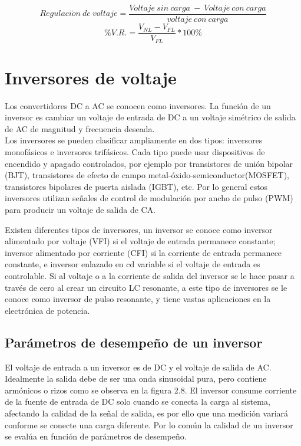 $$Regulaci\acute{o}n\:de\: voltaje = \dfrac{Voltaje\: sin \:carga \:-\: Voltaje\: con\: carga}{voltaje\: con\: carga}$$
\begin{equation} 
 \%V.R. = \dfrac{V_{NL}-V_{FL}}{V_{FL}}*100\%
\end{equation}





\newpage

\section{Inversores de voltaje}

Los convertidores DC a AC se conocen como inversores. La función de un inversor es cambiar un voltaje de entrada de DC a un voltaje simétrico de salida de AC de magnitud y frecuencia deseada. \\

Los inversores se pueden clasificar ampliamente en dos tipos: inversores monofásicos e inversores trifásicos. Cada tipo puede usar dispositivos de encendido y apagado controlados, por ejemplo por transistores de unión bipolar (BJT), transistores de efecto de campo metal-óxido-semiconductor(MOSFET), transistores bipolares de puerta aislada (IGBT), etc. Por lo general estos inversores utilizan señales de control de modulación por ancho de pulso  (PWM) para producir un voltaje de salida de CA.

Existen diferentes tipos de inversores, un inversor se conoce como inversor alimentado por voltaje (VFI) si el voltaje de entrada permanece constante; inversor alimentado por corriente (CFI) si la corriente de entrada permanece constante, e inversor enlazado en cd variable si el voltaje de entrada es controlable. Si al voltaje o a la corriente de salida del inversor se le hace pasar a través de cero al crear un circuito LC resonante, a este tipo de inversores se le conoce como inversor de pulso resonante, y tiene vastas aplicaciones en la electrónica de potencia. \\

\subsection{Parámetros de desempeño de un inversor}

El voltaje de entrada a un inversor es de DC y el voltaje de salida de AC. Idealmente la salida debe de ser una onda sinusoidal pura, pero contiene armónicos o rizos como se observa en la figura 2.8. El inversor consume corriente de la fuente de entrada de DC solo cuando se conecta la carga al sistema, afectando la calidad de la señal de salida, es por ello que una medición variará conforme se conecte una carga diferente. Por lo común la calidad de un inversor se evalúa en función de parámetros de desempeño. \\

